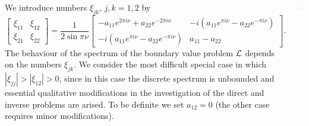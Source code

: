 \documentclass[a0paper,25pt]{tikzposter} %
\begin{document}
\begin{columns}
{We introduce numbers $\xi_{jk}$, $j,k=1,2$ by
\begin{equation}
\left[ \begin{array}{ll}
\xi_{11} & \xi_{12} \\ \xi_{21} & \xi_{22}
\end{array}\right]= \frac{1}{2\sin\pi\nu}
\left[ \begin{array}{ll}
-a_{11}e^{2\pi i\nu}+a_{22}e^{-2\pi i\nu} & -i(a_{11}e^{\pi i\nu}-a_{22}e^{-\pi i\nu}) \\
-i(a_{11}e^{\pi i\nu}-a_{22}e^{-\pi i\nu}) & a_{11}-a_{22} 
\end{array}\right] .    
\label{ksimatrix}
\end{equation}       
The behaviour of the spectrum of the boundary value problem ${\cal L}$ depends on the numbers $\xi_{jk}$. We consider the most difficult special case in which $|\xi_{jj}|>|\xi_{12}|>0$, since in this case the discrete spectrum is unbounded and essential qualitative modifications in the investigation of the direct and inverse problems are arised. 
To be definite we set $a_{12}=0$ (the other case requires minor modifications).
\begin{tikzfigure}
\includegraphics[scale=1]{spectra.pdf}
\end{tikzfigure}
}




 \end{columns}
\end{document}
